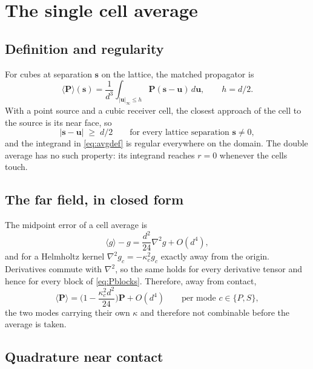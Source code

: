 \documentclass[11pt,a4paper]{article}
\newcommand{\bP}{\mathbf{P}}
\newcommand{\bs}{\mathbf{s}}
\begin{document}
\section{The single cell average}\label{sec:average}

\subsection{Definition and regularity}

For cubes at separation $\bs$ on the lattice, the matched propagator is
\begin{equation}\label{eq:avgdef}
  \langle\bP\rangle(\bs) = \frac{1}{d^3}\int_{|\mathbf{u}|_\infty\le h}
     \bP(\bs-\mathbf{u})\,d\mathbf{u}, \qquad h = d/2 .
\end{equation}
With a point source and a cubic receiver cell, the closest approach of the cell
to the source is its near face, so
\begin{equation}\label{eq:regular}
  |\bs-\mathbf{u}| \;\ge\; d/2 \qquad\text{for every lattice separation }\bs\neq0,
\end{equation}
and the integrand in \eqref{eq:avgdef} is regular everywhere on the domain.
The double average has no such property: its integrand reaches $r=0$ whenever
the cells touch.

\subsection{The far field, in closed form}

The midpoint error of a cell average is
\begin{equation}\label{eq:tail}
  \langle g\rangle - g = \frac{d^2}{24}\nabla^2 g + O(d^4),
\end{equation}
and for a Helmholtz kernel $\nabla^2 g_c = -\kappa_c^2 g_c$ exactly away from
the origin.  Derivatives commute with $\nabla^2$, so the same holds for every
derivative tensor and hence for every block of \eqref{eq:Pblocks}.  Therefore,
away from contact,
\begin{equation}\label{eq:scalartail}
  \langle\bP\rangle = \Big(1 - \frac{\kappa_c^2 d^2}{24}\Big)\bP + O(d^4)
  \qquad\text{per mode } c\in\{P,S\},
\end{equation}
the two modes carrying their own $\kappa$ and therefore not combinable before
the average is taken.

\subsection{Quadrature near contact}
\end{document}
